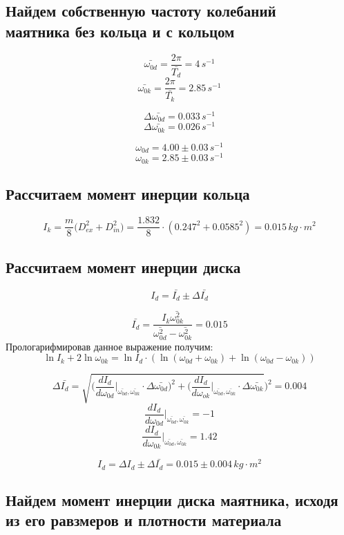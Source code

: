 \documentclass[a4paper,12pt]{report}
\begin{document}
\subsection*{Найдем собственную частоту колебаний \\ маятника без кольца и с кольцом}

\[ \bar{\omega_{0d}} = \frac{2\pi}{\bar{T_d}} = 4 \, s^{-1} \]
\[ \bar{\omega_{0k}} = \frac{2\pi}{\bar{T_k}} = 2.85 \, s^{-1} \]

\[ \Delta \bar{\omega_{0d}} = 0.033 \, s^{-1} \]
\[ \Delta \bar{\omega_{0k}} =  0.026 \, s^{-1}\]

\[ \omega_{0d} = 4.00 \pm 0.03 \, s^{-1} \]
\[ \omega_{0k} = 2.85 \pm 0.03 \, s^{-1} \]

\subsection*{Рассчитаем момент инерции кольца}

\[ I_k = \frac{m}{8}\biggl( D_{ex}^2 + D_{in}^2\biggr) = \frac{1.832}{8} \cdot (0.247^2 + 0.0585^2) = 0.015 \, kg\cdot m^2 \]

\subsection*{Рассчитаем момент инерции диска}

\[ I_d = \bar{I_d} \pm \Delta \bar{I_d} \]

\[ \bar{I_d} = \frac{I_k\bar{\omega_{0k}^2}}{\bar{\omega_{0d}^2}-\bar{\omega_{0k}^2}} = 0.015\]
Прологарифмировав данное выражение получим:
\[ \ln I_k + 2\ln \omega_{0k} = \ln I_d \cdot (\ln (\omega_{0d} + \omega_{0k} ) + \ln (\omega_{0d} - \omega_{0k})) \]

\[ \Delta \bar{I_d} = \sqrt{\biggl(\frac{dI_d}{d\omega_{0d}}\bigg \vert_{\bar{\omega_{0d}},\bar{\omega_{0k}}}\cdot \Delta \bar{\omega_{0d}}\biggr)^2 + \biggl(\frac{dI_d}{d\omega_{ok}}\bigg \vert_{\bar{\omega_{0d}},\bar{\omega_{0k}}}\cdot \Delta \bar{\omega_{0k}}}\biggr)^2 = 0.004\]
\[ \frac{dI_d}{d\omega_{0d}}\bigg \vert_{\bar{\omega_{0d}},\bar{\omega_{0k}}} = -1 \]
\[ \frac{dI_d}{d\omega_{0k}}\bigg \vert_{\bar{\omega_{0d}},\bar{\omega_{0k}}} = 1.42 \]

\[ I_d = \Delta I_d \pm \Delta \bar{I_d} = 0.015 \pm 0.004 \, kg\cdot m^2\]


\subsection*{Найдем момент инерции диска маятника, исходя из его равзмеров и плотности материала}
\end{document}
